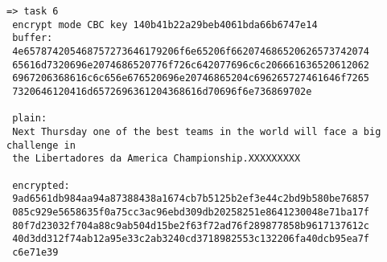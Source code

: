 \documentclass{article}
\begin{document}
\begin{verbatim}
=> task 6
 encrypt mode CBC key 140b41b22a29beb4061bda66b6747e14
 buffer:
 4e657874205468757273646179206f6e65206f662074686520626573742074
 65616d7320696e2074686520776f726c642077696c6c206661636520612062
 6967206368616c6c656e676520696e20746865204c696265727461646f7265
 7320646120416d6572696361204368616d70696f6e736869702e

 plain:
 Next Thursday one of the best teams in the world will face a big challenge in
 the Libertadores da America Championship.XXXXXXXXX

 encrypted:
 9ad6561db984aa94a87388438a1674cb7b5125b2ef3e44c2bd9b580be76857
 085c929e5658635f0a75cc3ac96ebd309db20258251e8641230048e71ba17f
 80f7d23032f704a88c9ab504d15be2f63f72ad76f289877858b9617137612c
 40d3dd312f74ab12a95e33c2ab3240cd3718982553c132206fa40dcb95ea7f
 c6e71e39

\end{verbatim}
\end{document}
